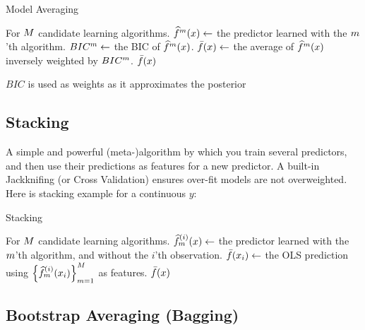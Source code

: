 \begin{algorithm}[H]
\caption{Model Averaging}
\label{algo:model_averaging}
\begin{algorithmic}
\State For $M$ candidate learning algorithms.
	\State $\widehat{f}^m(x) \gets$ the predictor learned with the $m$'th algorithm.
	\State $BIC^m \gets$ the BIC of $\widehat{f}^m(x)$.
\EndFor
\State $\bar{f}(x) \gets$ the average of $\widehat{f}^m(x)$ inversely weighted by $BIC^m$. 
\State \Return $\bar{f}(x)$
\end{algorithmic}
\end{algorithm}

$BIC$ is used as weights as it approximates the posterior 







\subsection{Stacking}
A simple and powerful (meta-)algorithm by which you train several predictors, and then use their predictions as features for a new predictor. 
A built-in Jackknifing (or Cross Validation) ensures over-fit models are not overweighted.
Here is  stacking example for a continuous $y$:

\begin{algorithm}[H]
\caption{Stacking}
\label{algo:stacking}
\begin{algorithmic}
\State For $M$ candidate learning algorithms.
		\State $\widehat{f}^{(i)}_m(x) \gets$ the predictor learned with the $m$'th algorithm, and without the $i$'th observation.
	\EndFor
	\State $\bar{f}(x_i) \gets$ the OLS prediction using $\left\{  \widehat{f}^{(i)}_m(x_i) \right\}_{m=1}^M$ as features. 
\EndFor
\State \Return $\bar{f}(x)$
\end{algorithmic}
\end{algorithm}







\subsection{Bootstrap Averaging (Bagging)}


